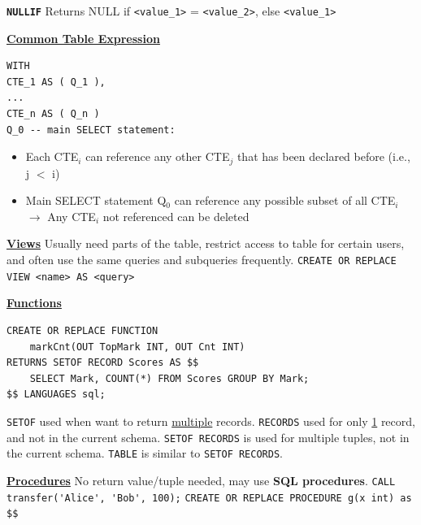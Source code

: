 \documentclass[10pt,landscape]{article}
\begin{document}
\begin{multicols*}{3}
\cprotect\textbf{\verb|NULLIF|}
Returns NULL if \verb|<value_1>| = \verb|<value_2>|, else \verb|<value_1>|

\begin{multicols*}{2}
\textbf{\underline{Common Table Expression}}
\begin{lstlisting}
WITH
CTE_1 AS ( Q_1 ),
...
CTE_n AS ( Q_n )
Q_0 -- main SELECT statement:
\end{lstlisting}
\begin{itemize}[topsep=0pt,noitemsep,wide=0pt, leftmargin=\dimexpr{} + 2\relax]
    \item Each CTE$_i$ can reference any other CTE$_j$ that has been declared before (i.e., j $<$ i)
    \item Main SELECT statement Q$_0$ can reference any possible subset of all CTE$_i$
    $\rightarrow$ Any CTE$_i$ not referenced can be deleted 
\end{itemize}
\end{multicols*}

\textbf{\underline{Views}}
Usually need parts of the table, restrict access to table for certain users,
and often use the same queries and subqueries frequently. \verb|CREATE OR REPLACE VIEW <name> AS <query>|

\textbf{\underline{Functions}}
\begin{lstlisting}
CREATE OR REPLACE FUNCTION 
    markCnt(OUT TopMark INT, OUT Cnt INT)
RETURNS SETOF RECORD Scores AS $$
    SELECT Mark, COUNT(*) FROM Scores GROUP BY Mark;
$$ LANGUAGES sql;
\end{lstlisting}
\verb|SETOF| used when want to return \underline{multiple} records.
\verb|RECORDS| used for only \underline{1} record, and not in the current schema.
\verb|SETOF RECORDS| is used for multiple tuples, not in the current schema.
\verb|TABLE| is similar to \verb|SETOF RECORDS|.

\textbf{\underline{Procedures}}
No return value/tuple needed, may use \textbf{SQL procedures}. \verb|CALL transfer('Alice', 'Bob', 100);|
\verb|CREATE OR REPLACE PROCEDURE g(x int) as $$|


\end{multicols*}
\end{document}

